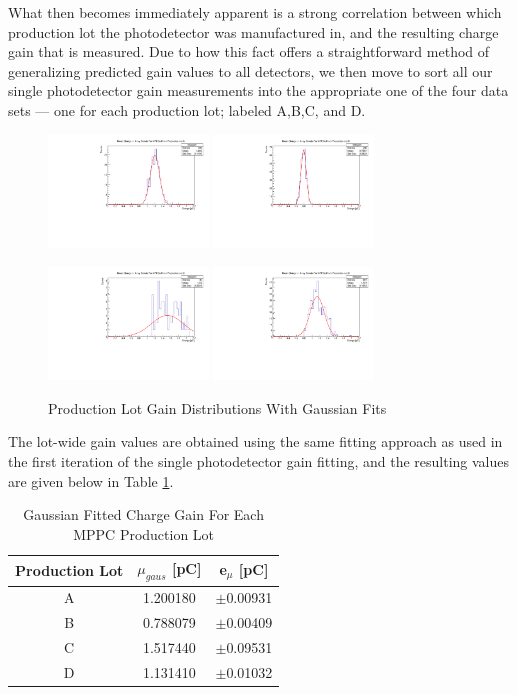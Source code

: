 What then becomes immediately apparent is a strong correlation between which production lot the photodetector was manufactured in, and the resulting charge gain that is measured. Due to how this fact offers a straightforward method of generalizing predicted gain values to all detectors, we then move to sort all our single photodetector gain measurements into the appropriate one of the four data sets --- one for each production lot; labeled A,B,C, and D. 
\begin{figure}[H]
    \centering
    \includegraphics[width=4.25cm]{graphics/plotahistfit2.pdf}
    \includegraphics[width=4.25cm]{graphics/plotbhistfit2.pdf}
    
    \includegraphics[width=4.25cm]{graphics/plotchistfit2.pdf}
    \includegraphics[width=4.25cm]{graphics/plotdhistfit2.pdf}
    \caption{Production Lot Gain Distributions With Gaussian Fits}
    \label{fig:lotgainfits}
\end{figure}

The lot-wide gain values are obtained using the same fitting approach as used in the first iteration of the single photodetector gain fitting, and the resulting values are given below in Table \ref{tab:lotgain}.
\begin{table}[H]
    \centering
    \begin{tabular}{c||c|c}
        \bf Production Lot & \bf \boldmath$\mu_{gaus}$ [pC] & \bf e\boldmath$_{\mu}$ [pC] \\
        \hline
        A & 1.200180 & $\pm$0.00931 \\
        B & 0.788079 & $\pm$0.00409 \\
        C & 1.517440 & $\pm$0.09531 \\
        D & 1.131410 & $\pm$0.01032
    \end{tabular}
    \caption{Gaussian Fitted Charge Gain For Each MPPC Production Lot}
    \label{tab:lotgain}
\end{table}

